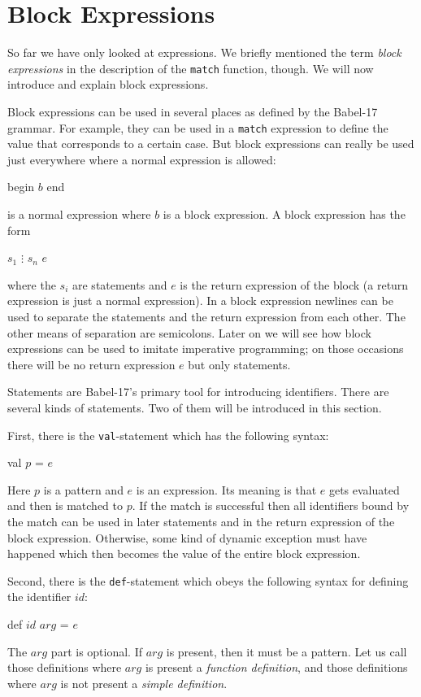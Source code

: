 \documentclass[11pt]{amsart}
\newcommand{\babelsrc}[1] {\lstinline!#1!}
\begin{document}
\section{Block Expressions}
So far we have only looked at expressions. We briefly mentioned the term \emph{block expressions} in the description of the \babelsrc{match} function, though.  We will now introduce and explain block expressions.

Block expressions can be used in several places as defined by the Babel-17 grammar. For example, they can be used in a \babelsrc{match} expression to define the value that corresponds to a certain case. But block expressions can really be used just everywhere where a normal expression is allowed: 
\begin{babellisting}
begin
  $b$
end
\end{babellisting}
is a normal expression where $b$ is a block expression. A block expression has the form
\begin{babellisting}
$s_1$
$\vdots$
$s_n$
$e$
\end{babellisting}
where the $s_i$ are statements and $e$ is the return expression of the block (a return expression is just a normal expression). In a block expression newlines can be used to separate the statements and the return expression from each other. The other means of separation are semicolons. Later on we will see how block expressions can be used to imitate imperative programming; on those occasions there will be no return expression $e$ but only statements.

Statements are Babel-17's primary tool for introducing identifiers. There are several kinds of statements. Two of them will be introduced in this section.

First, there is the \babelsrc{val}-statement which has the following syntax:
\begin{babellisting}
val $p$ = $e$
\end{babellisting}
Here $p$ is a pattern and $e$ is an expression. Its meaning is that $e$ gets evaluated and then is matched to $p$. If the match is successful then all identifiers bound by the match can be used in later statements and in the return expression of the block expression. Otherwise, some kind of dynamic exception must have happened which then becomes the value of the entire block expression. 

Second, there is the \babelsrc{def}-statement which obeys the following syntax for defining the identifier $id$:
\begin{babellisting}
def $id$ $arg$ = $e$
\end{babellisting}
The $arg$ part is optional. If $arg$ is present, then it must be a pattern. Let us call those definitions where $arg$ is present a \emph{function definition}, and those definitions where $arg$ is not present a \emph{simple definition}.  
\end{document}
